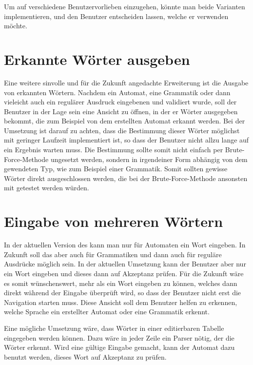 Um auf verschiedene Benutzervorlieben einzugehen, könnte man beide Varianten
implementieren, und den Benutzer entscheiden lassen, welche er verwenden
möchte.\vspace{10pt}

\section{Erkannte Wörter ausgeben}

Eine weitere sinvolle und für die Zukunft angedachte Erweiterung ist die
Ausgabe von erkannten Wörtern. Nachdem ein Automat, eine Grammatik oder dann
vieleicht auch ein regulärer Ausdruck eingebenen und validiert wurde, soll der
Benutzer in der Lage sein eine Ansicht zu öffnen, in der er Wörter ausgegeben
bekommt, die zum Beispiel von dem erstellten Automat erkannt werden. Bei der
Umsetzung ist darauf zu achten, dass die Bestimmung dieser Wörter möglichst mit
geringer Laufzeit implementiert ist, so dass der Benutzer nicht allzu lange auf
ein Ergebnis warten muss. Die Bestimmung sollte somit nicht einfach per
Brute-Force-Methode ungesetzt werden, sondern in irgendeiner Form abhängig von
dem gewendeten Typ, wie zum Beispiel einer Grammatik. Somit sollten gewisse
Wörter direkt ausgeschlossen werden, die bei der Brute-Force-Methode ansonsten
mit getestet werden würden.\vspace{10pt}


\section{Eingabe von mehreren Wörtern}

In der aktuellen Version des \gtitools kann man nur für Automaten ein Wort
eingeben. In Zukunft soll das aber auch für Grammatiken und dann auch für
reguläre Ausdrücke möglich sein. In der aktuellen Umsetzung kann der Benutzer
aber nur ein Wort eingeben und dieses dann auf Akzeptanz prüfen. Für die
Zukunft wäre es somit wünschenswert, mehr als ein Wort eingeben zu können,
welches dann direkt während der Eingabe überprüft wird, so dass der Benutzer
nicht erst die Navigation starten muss. Diese Ansicht soll dem Benutzer helfen
zu erkennen, welche Sprache ein erstellter Automat oder eine Grammatik
erkennt.\vspace{10pt}

Eine mögliche Umsetzung wäre, dass Wörter in einer editierbaren Tabelle
eingegeben werden können. Dazu wäre in jeder Zeile ein Parser nötig, der die
Wörter erkennt. Wird eine gültige Eingabe gemacht, kann der Automat dazu
benutzt werden, dieses Wort auf Akzeptanz zu prüfen.\vspace{10pt}


